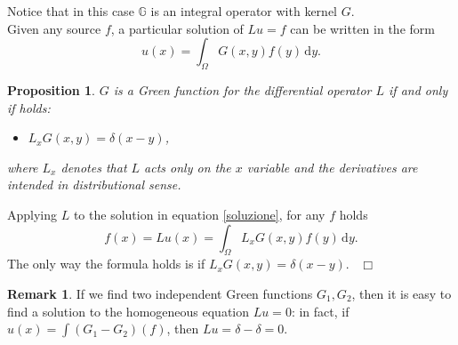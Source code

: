 \documentclass[a4paper,11pt]{article}	%
\theoremstyle{classicthm}
\newtheorem{prop}[theorem]{Proposition}
\theoremstyle{definition}
\theoremstyle{definition}
\newtheorem{oss}[theorem]{Remark}
\def\Proof{{\medbreak\noindent{\textbf{Proof.} }}}
\def\endproof{~\hfill $\Box$\\}
\newcommand{\dd}{\mathrm d}
\begin{document}
\noindent Notice that in this case $\mathds{G}$ is an integral operator with kernel $G$.\\

\noindent Given any source $f$, a particular solution of $Lu=f$ can be written in the form
\begin{equation}
		u(x)=	\int_\Omega G(x,y)f(y)\,\dd y.	\label{soluzione}
\end{equation}

\begin{prop}
	$G$ is a Green function for the differential operator $L$ if and only if holds:
	\begin{itemize}
		\item $L_xG(x,y)=\delta(x-y)$,
	\end{itemize}
	where $L_x$ denotes that $L$ acts only on the $x$ variable and the derivatives are intended in distributional sense.
\end{prop}
\Proof Applying $L$ to the solution in equation \eqref{soluzione}, for any $f$ holds
\[	f(x)=Lu(x)=\int_\Omega L_xG(x,y)f(y)\,\dd y.	\]
The only way the formula holds is if $L_xG(x,y)=\delta(x-y)$.
\endproof


\begin{oss}
	If we find two independent Green functions $G_1,G_2$, then it is easy to find a solution to the homogeneous equation $Lu=0$: in fact, if $u(x)=\int (G_1-G_2)(f)$, then $Lu=\delta-\delta=0$.
\end{oss}
\end{document}
